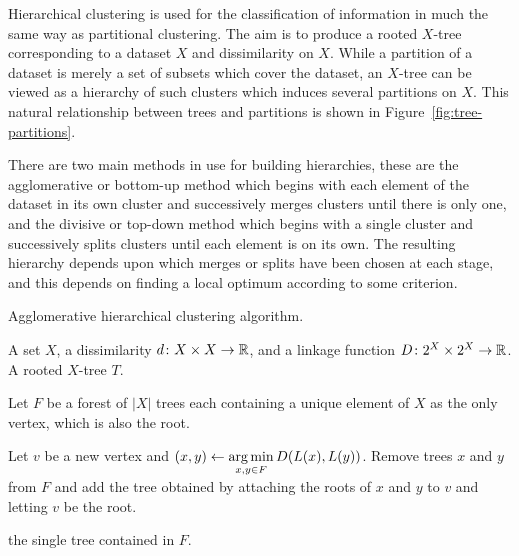 Hierarchical clustering is used for the classification of information in much
the same way as partitional clustering.  The aim is to produce a rooted
$X$-tree corresponding to a dataset $X$ and dissimilarity on $X$.  While a
partition of a dataset is merely a set of subsets which cover the dataset, an
$X$-tree can be viewed as a hierarchy of such clusters which induces several
partitions on $X$.  This natural relationship between trees and partitions is
shown in Figure~\ref{fig:tree-partitions}.

There are two main methods in use for building hierarchies, these are the
agglomerative or bottom-up method which begins with each element of the
dataset in its own cluster and successively merges clusters until there is
only one, and the divisive or top-down method which begins with a single
cluster and successively splits clusters until each element is on its own.
The resulting hierarchy depends upon which merges or splits have been chosen
at each stage, and this depends on finding a local optimum according to some
criterion.

\begin{algorithm}[h]
  \caption{Agglomerative hierarchical clustering algorithm.}
  \label{alg:agglomerative}

  \begin{algorithmic}
    \Require A set $X$, a dissimilarity $d \colon X \times X \to {\mathbb R}$, and a
    linkage function $D \colon 2^X \times 2^X \to {\mathbb R}$.
    \Ensure  A rooted $X$-tree $T$.

    \State Let $F$ be a forest of $|X|$ trees each containing a unique element
    of $X$ as the only vertex, which is also the root.


       \State Let $v$ be a new vertex and $\displaystyle (x,y) \gets \operatorname*{arg\,min}_{x,y
         \in F} D(L(x),L(y))$.
       \State Remove trees $x$ and $y$ from $F$ and add the tree obtained by
         attaching the roots of $x$ and $y$ to $v$ and letting $v$ be the root.
    
    \EndWhile

    \State \Return the single tree contained in $F$.
    
  \end{algorithmic}
\end{algorithm}

